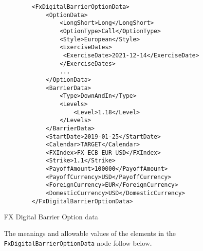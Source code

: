 \begin{listing}[H]
\begin{verbatim}
        <FxDigitalBarrierOptionData>
            <OptionData>
                <LongShort>Long</LongShort>
                <OptionType>Call</OptionType>
                <Style>European</Style>              
                <ExerciseDates>
                 <ExerciseDate>2021-12-14</ExerciseDate>
                </ExerciseDates> 
                ...
            </OptionData>
            <BarrierData>
                <Type>DownAndIn</Type>
                <Levels>
                    <Level>1.18</Level>
                </Levels>
            </BarrierData>
            <StartDate>2019-01-25</StartDate>
            <Calendar>TARGET</Calendar>
            <FXIndex>FX-ECB-EUR-USD</FXIndex>
            <Strike>1.1</Strike>
            <PayoffAmount>100000</PayoffAmount>
            <PayoffCurrency>USD</PayoffCurrency>            
            <ForeignCurrency>EUR</ForeignCurrency>
            <DomesticCurrency>USD</DomesticCurrency>
        </FxDigitalBarrierOptionData>
\end{verbatim}
\caption{FX Digital Barrier Option data}
\label{lst:fxdigitalbarrieroption_data}
\end{listing}

The meanings and allowable values of the elements in the \lstinline!FxDigitalBarrierOptionData!  node follow below.

